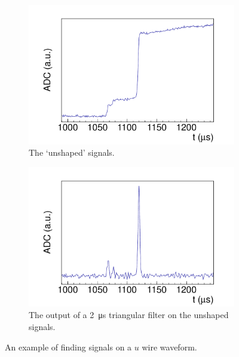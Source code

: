 \documentclass[herrin-thesis.tex]{subfiles}
\begin{document}
\begin{figure}
\begin{subfigure}[b]{0.48\textwidth}
		\includegraphics[width=\textwidth]{./plots/data_signal_finding_unshaped.pdf}
		\caption[Unshaped signals]{The `unshaped' signals.}
		\label{fig:data_signal_finding_unshaped}
	\end{subfigure}\hfill%
	\begin{subfigure}[b]{0.48\textwidth}
		\centering
		\includegraphics[width=\textwidth]{./plots/data_signal_finding_msf.pdf}
		\caption[Multiple signal finger output]{The output of a \SI{2}{\micro\s} triangular filter on the unshaped signals.}
		\label{fig:data_signal_finding_msf}
	\end{subfigure}
	\caption[The signal-finding process]{An example of finding signals on a \(u\) wire waveform.}
	\label{fig:data_signal_finding}
\end{figure}
\end{document}
